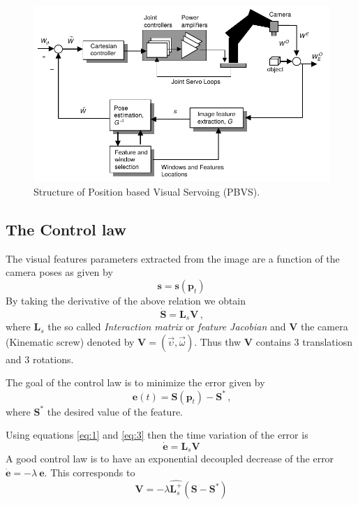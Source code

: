 \documentclass[a4paper,12pt]{article}
\begin{document}
\begin{figure}[tb]
         \centering
         \includegraphics[width=13cm]{../images/PBVS_loop.png}
         \caption{Structure of Position based Visual Servoing (PBVS).}
 	\label{fig:fig2}
\end{figure}




\subsection{The Control law}
The visual features parameters extracted from the image are a function of the camera poses as given by
\begin{equation}
	\mathbf{s} = \mathbf{s}(\mathbf{p}_t)
	\label{eq:1}
\end{equation}
By taking the derivative of the above relation we obtain
\begin{equation}
	\dot{\mathbf{S}} = \mathbf{L}_s \mathbf{V} \,\text{,}
	\label{eq:2}
\end{equation}
where $\mathbf{L}_s$ the so called \textit{Interaction matrix} or \textit{feature Jacobian} and $\mathbf{V}$  the 
camera (Kinematic screw) denoted by $\mathbf{V} = \left( \vec{\upsilon}, \vec{\omega} \right)$. Thus thw $\mathbf{V}$ contains 3 translatiosn and 3 rotations. 

The goal of the control law is to minimize the error given by
\begin{equation}
	\mathbf{e}(t) = \mathbf{S}\left(  \mathbf{p}_t \right) -\mathbf{S}^{\ast} \,\text{,}
	\label{eq:3}
\end{equation}
where $\mathbf{S}^{\ast}$ the desired value of the feature.

Using equations \eqref{eq:1} and \eqref{eq:3} then the time variation of the error is
\begin{equation}
	\dot{\mathbf{e}} =  \mathbf{L}_s   \mathbf{V}
	\label{eq:4}
\end{equation}
A good control law is to have an exponential decoupled decrease of the error 
$\dot{\mathbf{e}} = - \lambda\ \mathbf{e}$. This corresponds to
\begin{equation}
	\mathbf{V} = -\lambda \widehat{\mathbf{L}_s^+}\left(\mathbf{S}  -\mathbf{S}^{\ast} \right)
	\label{eq:5}
\end{equation}
\end{document}
